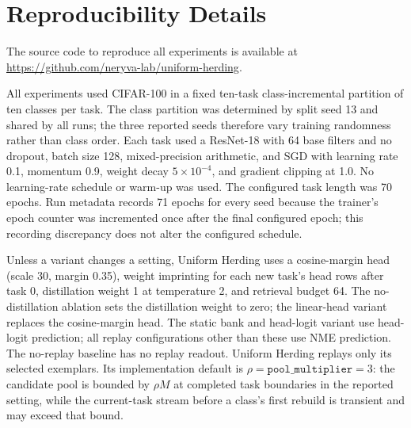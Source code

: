 \section{Reproducibility Details}
\label{app:reproducibility}

The source code to reproduce all experiments is available at \url{https://github.com/neryva-lab/uniform-herding}.

All experiments used CIFAR-100 in a fixed ten-task class-incremental
partition of ten classes per task.  The class partition was determined by split
seed 13 and shared by all runs; the three reported seeds therefore vary
training randomness rather than class order.  Each task used a ResNet-18 with
64 base filters and no dropout, batch size 128, mixed-precision arithmetic, and
SGD with learning rate 0.1, momentum 0.9, weight decay $5\times10^{-4}$, and
gradient clipping at 1.0.  No learning-rate schedule or warm-up was used.  The
configured task length was 70 epochs.  Run metadata records 71 epochs for every
seed because the trainer's epoch counter was incremented once after the final
configured epoch; this recording discrepancy does not alter the configured
schedule.

Unless a variant changes a setting, Uniform Herding uses a
cosine-margin head (scale 30, margin 0.35), weight imprinting for each new
task's head rows after task 0, distillation weight 1 at temperature 2, and
retrieval budget 64.  The no-distillation ablation sets the distillation weight
to zero; the linear-head variant replaces the cosine-margin head.  The static
bank and head-logit variant use head-logit prediction; all replay
configurations other than these use NME prediction.  The no-replay baseline has
no replay readout.  Uniform Herding replays only its selected exemplars.  Its
implementation default is $\rho=\texttt{pool\_multiplier}=3$:
the candidate pool is bounded by $\rho M$ at completed task boundaries in the
reported setting, while the current-task stream before a class's first rebuild
is transient and may exceed that bound.

